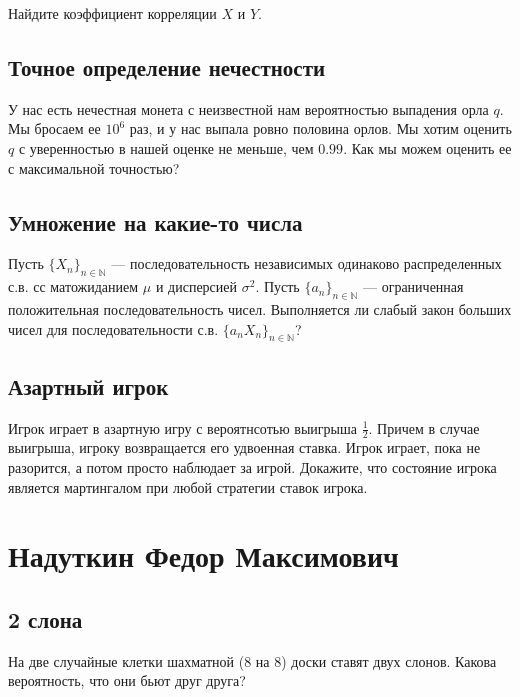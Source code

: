 \documentclass[12pt]{article}
\newcommand\N{\mathbb{N}}
\begin{document}
Найдите коэффициент корреляции $X$ и $Y$.



\subsection{Точное определение нечестности}

У нас есть нечестная монета с неизвестной нам вероятностью выпадения орла $q$. Мы бросаем ее $10^6$ раз, и у нас выпала ровно половина орлов. Мы хотим оценить $q$ с уверенностью в нашей оценке не меньше, чем $0.99$. Как мы можем оценить ее с максимальной точностью? 



\subsection{Умножение на какие-то числа}

Пусть $\{X_n\}_{n \in \N}$ --- последовательность независимых одинаково распределенных с.в. сс матожиданием $\mu$ и дисперсией $\sigma^2$. Пусть $\{a_n\}_{n \in \N}$ --- ограниченная положительная последовательность чисел. Выполняется ли слабый закон больших чисел для последовательности с.в. $\{a_n X_n\}_{n \in \N}$?



\subsection{Азартный игрок}

Игрок играет в азартную игру с вероятнсотью выигрыша $\frac{1}{2}$. Причем в случае выигрыша, игроку возвращается его удвоенная ставка. Игрок играет, пока не разорится, а потом просто наблюдает за игрой. Докажите, что состояние игрока является мартингалом при любой стратегии ставок игрока.



\newpage
\section{Надуткин Федор Максимович}

\subsection{2 слона}

На две случайные клетки шахматной (8 на 8) доски ставят двух слонов. Какова вероятность, что они бьют друг друга?
\end{document}
